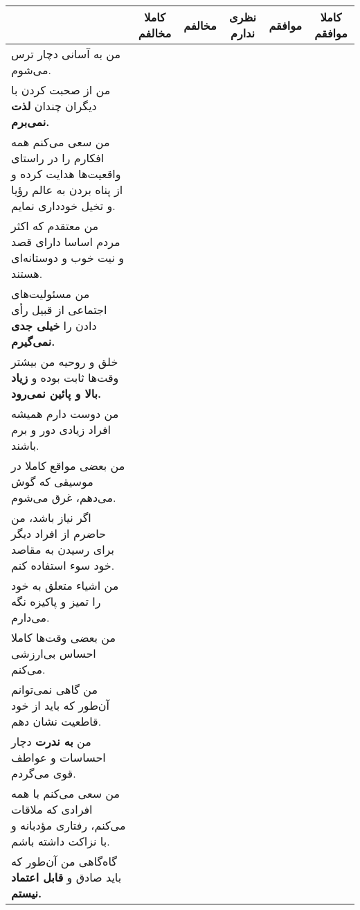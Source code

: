\documentclass[a4paper,10pt]{article}
\begin{document}
\begin{center}
\begin{tabular}{|p{6cm}|c|c|c|c|c|}
\hline
 & کاملا مخالفم & مخالفم & نظری ندارم & موافقم & کاملا موافقم\\
\hline

من به آسانی دچار ترس می‌شوم.& & & & & \\
\hline

من از صحبت کردن با دیگران چندان \textbf{لذت نمی‌برم.}& & & & & \\
\hline

من سعی می‌کنم همه افکارم را در راستای واقعیت‌ها هدایت کرده و از پناه بردن به عالم رؤیا و تخیل خودداری نمایم.& & & & & \\
\hline
 من معتقدم که اکثر مردم اساسا دارای قصد و نیت خوب و دوستانه‌ای هستند.& & & & & \\
\hline

من مسئولیت‌های اجتماعی از قبیل رأی دادن را \textbf{خیلی جدی نمی‌گیرم.}& & & & & \\
\hline

خلق و روحیه من بیشتر وقت‌ها ثابت بوده و \textbf{زیاد بالا و پائین نمی‌رود.}& & & & & \\
\hline

من دوست دارم همیشه افراد زیادی دور و برم باشند.& & & & & \\
\hline

من بعضی مواقع کاملا در موسیقی که گوش می‌دهم، غرق می‌شوم.& & & & & \\
\hline

اگر نیاز باشد، من حاضرم از افراد دیگر برای رسیدن به مقاصد خود سوء استفاده کنم.& & & & & \\
\hline

من اشیاء متعلق به خود را تمیز و پاکیزه نگه می‌دارم.& & & & & \\
\hline

من بعضی وقت‌ها کاملا احساس بی‌ارزشی می‌کنم.& & & & & \\
\hline

من گاهی نمی‌توانم آن‌طور که باید از خود قاطعیت نشان دهم.& & & & & \\
\hline

من \textbf{به ندرت} دچار احساسات و عواطف قوی می‌گردم.& & & & & \\
\hline

من سعی می‌کنم با همه افرادی که ملاقات می‌کنم، رفتاری مؤدبانه و با نزاکت داشته باشم.& & & & & \\
\hline

گاه‌گاهی من آن‌طور که باید صادق و \textbf{قابل اعتماد نیستم.}& & & & & \\
\hline


\end{tabular}
\end{center}
\end{document}
